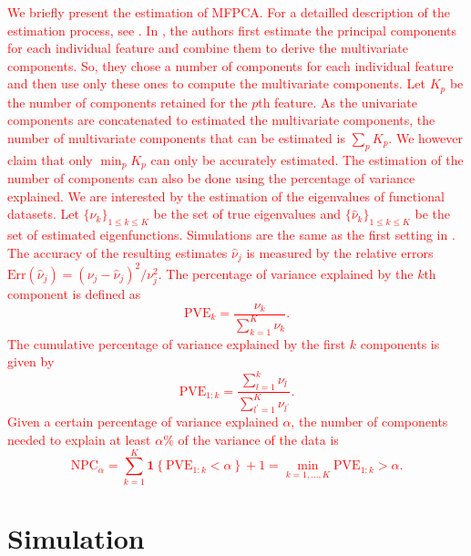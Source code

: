 \textcolor{red}{We briefly present the estimation of MFPCA. For a detailled description of the estimation process, see \cite[Section 3]{happMultivariateFunctionalPrincipal2018}. In \cite{happMultivariateFunctionalPrincipal2018}, the authors first estimate the principal components for each individual feature and combine them to derive the multivariate components. So, they chose a number of components for each individual feature and then use only these ones to compute the multivariate components. Let $K_p$ be the number of components retained for the $p$th feature. As the univariate components are concatenated to estimated the multivariate components, the number of multivariate components that can be estimated is $\sum_p K_p$. We however claim that only $\min_p K_p$ can only be accurately estimated.
The estimation of the number of components can also be done using the percentage of variance explained. 
We are interested by the estimation of the eigenvalues of functional datasets. Let $\{\nu_k\}_{1 \leq k \leq K}$ be the set of true eigenvalues and $\{\widehat{\nu}_k\}_{1 \leq k \leq K}$ be the set of estimated eigenfunctions. Simulations are the same as the first setting in \cite{happMultivariateFunctionalPrincipal2018}. The accuracy of the resulting estimates $\widehat{\nu}_j$ is measured by the relative errors $\text{Err}(\widehat{\nu}_j)  = (\nu_j - \widehat{\nu}_j)^2 / \nu^2_j$. The percentage of variance explained by the $k$th component is defined as
\begin{equation}\label{eq:pve}
     \text{PVE}_k = \frac{\nu_k}{\sum_{k = 1}^K \nu_k}.
\end{equation}
The cumulative percentage of variance explained by the first $k$ components is given by
\begin{equation}\label{eq:cum_pve}
     \text{PVE}_{1:k} = \frac{\sum_{l = 1}^k \nu_l}{\sum_{l^\prime = 1}^K \nu_{l^\prime}}.
\end{equation}
Given a certain percentage of variance explained $\alpha$, the number of components needed to explain at least $\alpha\%$ of the variance of the data is
\begin{equation}\label{eq:npc}
     \text{NPC}_{\alpha} = \sum_{k = 1}^K \mathbf{1}\left\{\text{PVE}_{1:k} < \alpha\right\} + 1 = \min_{k = 1, \dots, K} \text{PVE}_{1:k} > \alpha.
\end{equation}}


\section{Simulation} %
\label{sec:simulation}

